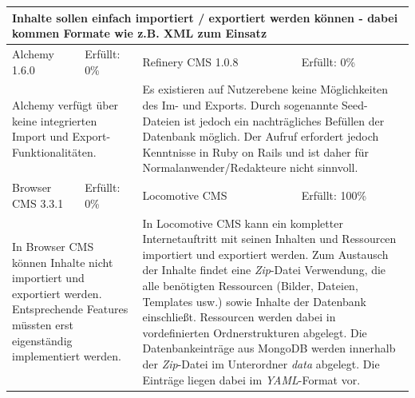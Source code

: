 \newline
\newline
\newline
\begin{tabular}[!ht]{|l|l|l|l|}
\hline
\multicolumn{4}{|p{15cm}|}{\textbf{Inhalte sollen einfach importiert / exportiert werden können - dabei kommen Formate wie z.B. XML zum Einsatz}} \\
\hline
  Alchemy 1.6.0 & \cellcolor{red}Erfüllt: 0\% & Refinery CMS 1.0.8 & \cellcolor{red}Erfüllt: 0\% \\
  \hline
  \multicolumn{2}{|p{7.5cm}|}{Alchemy verfügt über keine integrierten Import und Export-Funktionalitäten.}
   & \multicolumn{2}{p{7.5cm}|}{Es existieren auf Nutzerebene keine Möglichkeiten des Im- und Exports. Durch sogenannte Seed-Dateien ist jedoch ein nachträgliches Befüllen der Datenbank möglich. Der Aufruf erfordert jedoch Kenntnisse in Ruby on Rails und ist daher für Normalanwender/Redakteure nicht sinnvoll.} \\
  \hline
  Browser CMS 3.3.1 & \cellcolor{red}Erfüllt: 0\% & Locomotive CMS & \cellcolor{green}Erfüllt: 100\% \\
  \hline
  \multicolumn{2}{|p{7.5cm}|}{In Browser CMS können Inhalte nicht importiert und exportiert werden. Entsprechende Features müssten erst eigenständig implementiert werden.} & \multicolumn{2}{p{7.5cm}|}{In Locomotive CMS kann ein kompletter Internetauftritt mit seinen Inhalten und Ressourcen importiert und exportiert werden. Zum Austausch der Inhalte findet eine \emph{Zip}-Datei Verwendung, die alle benötigten Ressourcen (Bilder, Dateien, Templates usw.) sowie Inhalte der Datenbank einschließt. Ressourcen werden dabei in vordefinierten Ordnerstrukturen abgelegt. Die Datenbankeinträge aus MongoDB werden innerhalb der \emph{Zip}-Datei im Unterordner \emph{data} abgelegt. Die Einträge liegen dabei  im \emph{YAML}-Format vor.} \\
\hline
\end{tabular}
\newline
\newline
\newline
